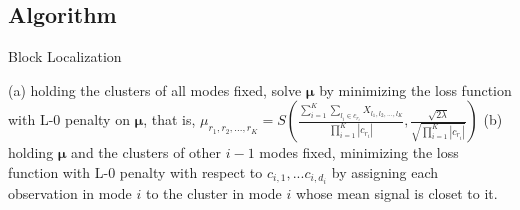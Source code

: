 \documentclass{article}
\begin{document}
\begin{appendices}
	\section{Algorithm}
	\begin{algorithm}
		\caption{Block Localization}
		\label{alg:B}
		\begin{algorithmic}
			\REPEAT 
			\STATE (a) holding the clusters of all modes fixed, solve $\bm{\mu}$ by minimizing the loss function with L-0 penalty on $\bm{\mu}$, that is,
			$\mu_{r_1,r_2,...,r_K} = S(\frac{\sum_{i=1}^K\sum_{l_i\in c_{r_i}}X_{l_1,l_2,...,l_K}}{\prod_{i=1}^{K}|c_{r_i}|},\frac{\sqrt{2\lambda}}{\sqrt{\prod_{i=1}^{K}|c_{r_i}|}})$
			\STATE (b) holding  $\bm{\mu}$ and the clusters of other $i-1$ modes fixed, minimizing the loss function with L-0 penalty with respect to $c_{i,1},...c_{i,d_i}$ by assigning each observation in mode $i$ to the cluster in mode $i$ whose mean signal is closet to it.
		\ENDFOR
		\end{algorithmic}
	\end{algorithm}

\end{appendices}
\end{document}

